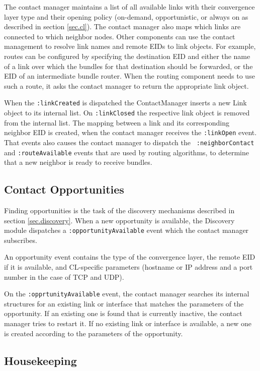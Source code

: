 \documentclass{article}
\begin{document}
The contact manager maintains a list of all available links with their
convergence layer type and their opening policy (on-demand, opportunistic, or
always on as described in section \ref{sec.cl}). The contact manager also maps
which links are connected to which neighbor nodes. Other components can use the
contact management to resolve link names and remote EIDs to link objects. For
example, routes can be configured by specifying the destination EID and either
the name of a link over which the bundles for that destination should be
forwarded, or the EID of an intermediate bundle router. When the routing
component needs to use such a route, it asks the contact manager to return the
appropriate link object.

When the {\tt :linkCreated} is dispatched the ContactManager inserts a new Link
object to its internal list.  On {\tt :linkClosed} the respective link object is
removed from the internal list. The mapping between a link and its corresponding
neighbor EID is created, when the contact manager receives the {\tt :linkOpen}
event. That events also causes the contact manager to dispatch the {\tt
:neighborContact} and {\tt :routeAvailable} events that are used by routing
algorithms, to determine that a new neighbor is ready to receive bundles.

\subsection{Contact Opportunities}

Finding opportunities is the task of the discovery mechanisms described in
section \ref{sec.discovery}.  When a new opportunity is available, the Discovery
module dispatches a {\tt :opportunityAvailable} event which the contact manager
subscribes.

An opportunity event contains the type of the convergence layer, the remote EID
if it is available, and CL-specific parameters (hostname or IP address and a
port number in the case of TCP and UDP).

On the {\tt :opprtunityAvailable} event, the contact manager searches its
internal structures for an existing link or interface that matches the
parameters of the opportunity. If an existing one is found that is currently
inactive, the contact manager tries to restart it. If no existing link or
interface is available, a new one is created according to the parameters of the
opportunity.

\subsection{Housekeeping}
\end{document}

